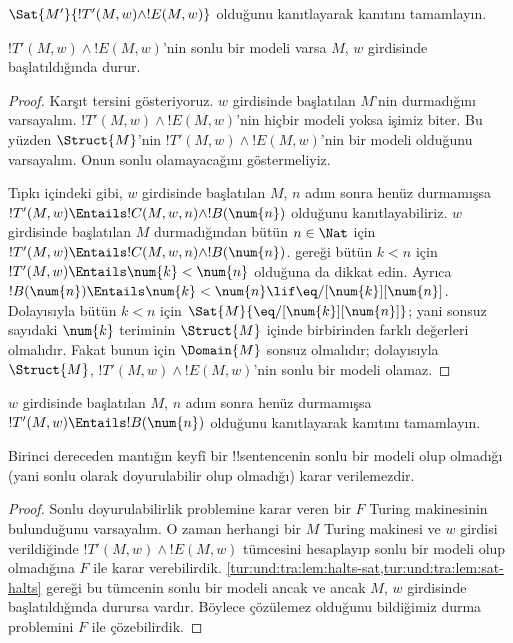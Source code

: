 \begin{prob}
  $\Sat{M'}{!T'(M,w)\land !E(M,w)}$ olduğunu kanıtlayarak
   kanıtını tamamlayın.
\end{prob}

\begin{lem}
  $!T'(M,w)\land !E(M,w)$'nin sonlu bir modeli varsa $M$, $w$ girdisinde
  başlatıldığında durur.
\end{lem}

\begin{proof}
  Karşıt tersini gösteriyoruz. $w$ girdisinde başlatılan $M$'nin durmadığını
  varsayalım. $!T'(M,w)\land !E(M,w)$'nin hiçbir modeli yoksa işimiz biter.
  Bu yüzden $\Struct{M}$'nin $!T'(M,w)\land !E(M,w)$'nin bir modeli olduğunu
  varsayalım. Onun sonlu olamayacağını göstermeliyiz.
  
  Tıpkı  içindeki gibi, $w$ girdisinde başlatılan $M$,
  $n$ adım sonra henüz durmamışsa
  $!T'(M,w)\Entails !C(M,w,n)\land !B(\num{n})$ olduğunu kanıtlayabiliriz.
  $w$ girdisinde başlatılan $M$ durmadığından bütün $n\in\Nat$ için
  $!T'(M,w)\Entails !C(M,w,n)\land !B(\num{n})$.
   gereği bütün $k<n$ için
  $!T'(M,w)\Entails \num{k}<\num{n}$ olduğuna da dikkat edin. Ayrıca
  $!B(\num{n})\Entails \num{k}<\num{n}\lif
  \eq/[\num{k}][\num{n}]$. Dolayısıyla bütün $k<n$ için
  $\Sat{M}{\eq/[\num{k}][\num{n}]}$; yani sonsuz sayıdaki $\num{k}$ teriminin
  $\Struct{M}$ içinde birbirinden farklı değerleri olmalıdır. Fakat bunun için
  $\Domain{M}$ sonsuz olmalıdır; dolayısıyla $\Struct{M}$,
  $!T'(M,w)\land !E(M,w)$'nin sonlu bir modeli olamaz.
\end{proof}

\begin{prob}
  $w$ girdisinde başlatılan $M$, $n$ adım sonra henüz durmamışsa
  $!T'(M,w)\Entails !B(\num{n})$ olduğunu kanıtlayarak
   kanıtını tamamlayın.
\end{prob}

\begin{thm}
  Birinci dereceden mantığın keyfî bir !!{sentence}{}nin sonlu bir modeli olup
  olmadığı (yani sonlu olarak doyurulabilir olup olmadığı) karar verilemezdir.
\end{thm}

\begin{proof}
  Sonlu doyurulabilirlik problemine karar veren bir $F$ Turing makinesinin
  bulunduğunu varsayalım. O zaman herhangi bir $M$ Turing makinesi ve $w$
  girdisi verildiğinde $!T'(M,w)\land !E(M,w)$ tümcesini hesaplayıp sonlu bir
  modeli olup olmadığına $F$ ile karar verebilirdik.
  \cref{tur:und:tra:lem:halts-sat,tur:und:tra:lem:sat-halts} gereği bu
  tümcenin sonlu bir modeli ancak ve ancak $M$, $w$ girdisinde başlatıldığında
  durursa vardır. Böylece çözülemez olduğunu bildiğimiz durma problemini $F$
  ile çözebilirdik.
\end{proof}

